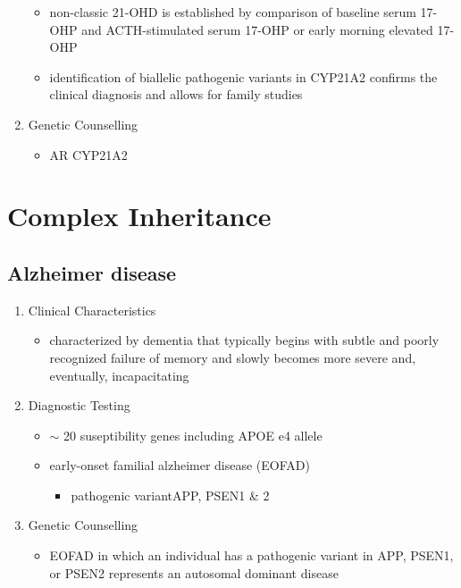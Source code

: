 \documentclass[12pt]{scrartcl}
\begin{document}
\begin{enumerate}
\begin{itemize}
\item non-classic 21-OHD is established by comparison of baseline serum
17-OHP and ACTH-stimulated serum 17-OHP or early morning elevated
17-OHP
\item identification of biallelic pathogenic variants in CYP21A2 confirms
the clinical diagnosis and allows for family studies
\end{itemize}
\item Genetic Counselling
\label{sec:org0b6052b}
\begin{itemize}
\item AR CYP21A2
\end{itemize}
\end{enumerate}

\section{Complex Inheritance}
\label{sec:orga26643b}
\subsection{Alzheimer disease}
\label{sec:orgd5250f7}
\begin{enumerate}
\item Clinical Characteristics
\label{sec:org06b2d1f}
\begin{itemize}
\item characterized by dementia that typically begins with subtle and
poorly recognized failure of memory and slowly becomes more severe
and, eventually, incapacitating
\end{itemize}
\item Diagnostic Testing
\label{sec:orge099cfe}
\begin{itemize}
\item \(\sim\) 20 suseptibility genes including APOE e4 allele
\item early-onset familial alzheimer disease (EOFAD)
\begin{itemize}
\item pathogenic variantAPP, PSEN1 \& 2
\end{itemize}
\end{itemize}
\item Genetic Counselling
\label{sec:orgded73fb}
\begin{itemize}
\item EOFAD in which an individual has a pathogenic variant in APP, PSEN1,
or PSEN2 represents an autosomal dominant disease
\end{itemize}
\end{enumerate}
\end{document}
